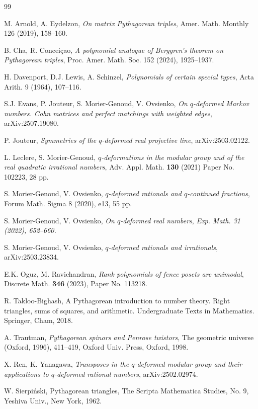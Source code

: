 \documentclass{article}[12pt]
\theoremstyle{plain}
\theoremstyle{definition}
\begin{document}
\begin{thebibliography}{99}

M. Arnold, A. Eydelzon, 
{\it On matrix Pythagorean triples},
Amer. Math. Monthly 126 (2019), 158--160.

B. Cha, R. Concei\c{c}ao, 
{\it A polynomial analogue of Berggren's theorem on Pythagorean triples},
Proc. Amer. Math. Soc. 152 (2024), 1925--1937.

H. Davenport, D.J. Lewis, A. Schinzel,
{\it Polynomials of certain special types},
Acta Arith. 9 (1964), 107--116.

 S.J. Evans, P. Jouteur, S. Morier-Genoud, V. Ovsienko,
 {\it On $q$-deformed Markov numbers. Cohn matrices and perfect matchings with weighted edges},
arXiv:2507.19080.

P. Jouteur, 
{\it Symmetries of the $q$-deformed real projective line},
arXiv:2503.02122.
 
L. Leclere, S. Morier-Genoud, 
{\it {$q$}-deformations in the modular group and of the real quadratic
  irrational numbers},
Adv. Appl. Math. {\bf 130} (2021) Paper No. 102223, 28 pp.

S. Morier-Genoud, V. Ovsienko,
{\it {$q$}-deformed rationals and {$q$}-continued fractions},
Forum Math. Sigma 8 (2020), e13, 55 pp.

S. Morier-Genoud, V. Ovsienko,
{\it On $q$-deformed real numbers},
{\em Exp. Math. 31 (2022), 652--660.}

S. Morier-Genoud, V. Ovsienko,
{\it $q$-deformed rationals and irrationals},
arXiv:2503.23834.

E.K. Oguz, M. Ravichandran, 
{\it Rank polynomials of fence posets are unimodal},
Discrete Math. {\bf 346} (2023), Paper No. 113218.

R. Takloo-Bighash, 
A Pythagorean introduction to number theory.
Right triangles, sums of squares, and arithmetic. 
Undergraduate Texts in Mathematics. Springer, Cham, 2018.

A. Trautman, 
{\it Pythagorean spinors and Penrose twistors},
The geometric universe (Oxford, 1996), 411--419, 
Oxford Univ. Press, Oxford, 1998.

X. Ren, K. Yanagawa,
{\it Transposes in the $q$-deformed modular group and their applications to 
$q$-deformed rational numbers},
arXiv:2502.02974.

W. Sierpi\'nski, 
Pythagorean triangles, 
The Scripta Mathematica Studies, No. 9, 
Yeshiva Univ., New York, 1962.

\end{thebibliography}
\end{document}
